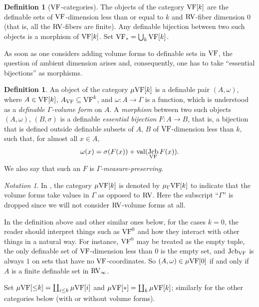 \documentclass[12pt]{amsart}
\newcommand{\memph}[1]{{\color{magenta}\emph{#1}}}
\theoremstyle{plain}
\theoremstyle{definition}
\newtheorem{defn}[thm]{Definition}
\theoremstyle{remark}
\newtheorem{nota}[thm]{Notation}
\numberwithin{equation}{section}
\theoremstyle{plain}
\newcommand{\VF}{\textup{VF}}
\newcommand{\RV}{\textup{RV}}
\DeclareMathOperator{\jcb}{Jcb}
\newcommand{\0}{\emptyset}
\newcommand{\fun}{\longrightarrow}
\newcommand{\sub}{\subseteq}
\newcommand{\mVF}{{\mu}{\VF}}
\newcommand{\mgVF}{{\mu} {\VF}}
\DeclareMathOperator{\vv}{val}
\begin{document}
\begin{defn}[$\VF$-categories]\label{defn:VF:cat}
The objects of the category $\VF[k]$ are the definable sets of $\VF$-dimension less than or equal to $k$ and $\RV$-fiber dimension $0$ (that is, all the $\RV$-fibers are finite). Any definable bijection between two such objects is a morphism of $\VF[k]$. Set $\VF_* = \bigcup_k \VF[k]$.
\end{defn}

As soon as one considers adding volume forms to definable sets in $\VF$, the question of ambient dimension arises and, consequently, one has to take ``essential bijections'' as morphisms.

 \begin{defn}
\label{defn:VF:mu:G}
An object of the category $\mgVF[k]$ is a definable pair $(A, \omega)$, where $A \in \VF[k]$, $A_{\VF} \sub \VF^k$, and $\omega : A \fun \Gamma$ is a function, which is understood as a \memph{definable $\Gamma$-volume form} on $A$. A \memph{morphism} between two such objects $(A, \omega)$, $(B, \sigma)$ is a definable \memph{essential bijection} $F : A \fun B$, that is, a bijection that is defined outside definable subsets of $A$, $B$ of $\VF$-dimension less than $k$, such that, for almost all $x \in A$,
\begin{equation}\label{cond:mg}
\omega(x) = \sigma(F(x)) + \vv(\jcb_{\VF} F(x)).
\end{equation}
We also say that such an $F$ is \memph{$\Gamma$-measure-preserving}.
\end{defn}

\begin{nota}
In \cite{hrushovski:kazhdan:integration:vf}, the category $\mgVF[k]$ is denoted by ${\mu_{\Gamma}}{\VF[k]}$ to indicate that the volume forms take values in $\Gamma$ as opposed to $\RV$. Here the subscript ``$\Gamma$'' is dropped since  we will not consider $\RV$-volume forms at all.
\end{nota}

In the definition above and other similar ones below, for the cases $k =0$, the reader should interpret things such as $\VF^0$ and how they interact with other things in a natural way. For instance, $\VF^0$ may be treated as the empty tuple, the only definable set of $\VF$-dimension less than $0$ is the empty set, and $\jcb_{\VF}$ is always $1$ on sets that have no $\VF$-coordinates. So $(A, \omega) \in \mgVF[0]$ if and only if $A$ is a finite definable set in $\RV_\infty$.

Set $\mgVF[{\leq} k] = \coprod_{i \leq k} \mgVF[i]$ and $\mgVF[*] = \coprod_{k} \mVF[k]$; similarly for the other categories below (with or without volume forms).
\end{document}

